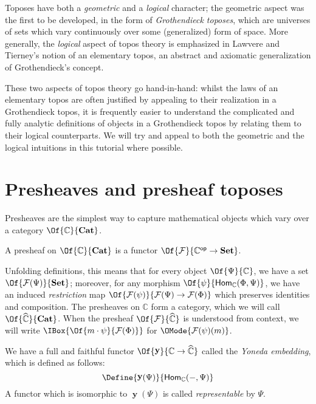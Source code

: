\documentclass{article}
\newcommand\Cats{\mathbf{Cat}}
\newcommand\Sets{\mathbf{Set}}
\newcommand\OpCat[1]{{{#1}^{\mathsf{op}}}}
\newcommand\Hom[3]{\mathsf{Hom}_{#1} (#2, #3)}
\DeclareMathOperator\OpYoneda{\mathbf{y}}
\newcommand\Yoneda[1]{\OpYoneda({#1})}
\newcommand\Psh[1]{\widehat{#1}}
\begin{document}
Toposes have both a \emph{geometric} and a \emph{logical} character;
the geometric aspect was the first to be developed, in the form of
\emph{Grothendieck toposes}, which are universes of sets which vary
continuously over some (generalized) form of space. More generally,
the \emph{logical} aspect of topos theory is emphasized in Lawvere and
Tierney's notion of an elementary topos, an abstract and axiomatic
generalization of Grothendieck's concept.

These two aspects of topos theory go hand-in-hand: whilst the laws of
an elementary topos are often justified by appealing to their
realization in a Grothendieck topos, it is frequently easier to
understand the complicated and fully analytic definitions of objects
in a Grothendieck topos by relating them to their logical
counterparts. We will try and appeal to both the geometric and the
logical intuitions in this tutorial where possible.

\section{Presheaves and presheaf toposes}
Presheaves are the simplest way to capture mathematical objects which
vary over a category $\Of{\mathbb{C}}{\Cats}$.

\begin{definition}[Presheaf]
  A presheaf on $\Of{\mathbb{C}}{\Cats}$ is a functor
  $\Of{\mathcal{F}}{\OpCat{\mathbb{C}}\to\Sets}$.
\end{definition}

Unfolding definitions, this means that for every object
$\Of{\Psi}{\mathbb{C}}$, we have a set
$\Of{\mathcal{F}(\Psi)}{\Sets}$; moreover, for any morphism
$\Of{\psi}{\Hom{\mathbb{C}}{\Phi}{\Psi}}$, we have an induced
\emph{restriction} map
$\Of{\mathcal{F}(\psi)}{\mathcal{F}(\Psi)\to \mathcal{F}(\Phi)}$ which preserves
identities and composition.
%
The presheaves on $\mathbb{C}$ form a category, which we will call
$\Of{\Psh{\mathbb{C}}}{\Cats}$.  When the presheaf
$\Of{\mathcal{F}}{\Psh{\mathbb{C}}}$ is understood from context, we
will write $\IBox{\Of{m\cdot \psi}{\mathcal{F}(\Phi)}}$ for
$\OMode{\mathcal{F}(\psi)(m)}$.

\begin{definition}
  We have a full and faithful functor
  $\Of{\OpYoneda}{\mathbb{C}\to\Psh{\mathbb{C}}}$ called the
  \emph{Yoneda embedding}, which is defined as follows:
  \[
    \Define{
      \Yoneda{\Psi}
    }{
      \Hom{\mathbb{C}}{-}{\Psi}
    }
  \]
  A functor which is isomorphic to $\Yoneda{\Psi}$ is called
  \emph{representable} by $\Psi$.
\end{definition}
\end{document}
